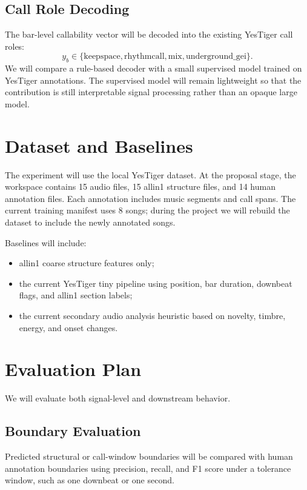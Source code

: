 \documentclass[lettersize,journal]{IEEEtran}
\begin{document}
\subsection{Call Role Decoding}
The bar-level callability vector will be decoded into the existing YesTiger call roles:
\begin{equation}
y_b \in
\{\mathrm{keepspace}, \mathrm{rhythmcall}, \mathrm{mix}, \mathrm{underground\_gei}\}.
\end{equation}
We will compare a rule-based decoder with a small supervised model trained on YesTiger annotations. The supervised model will remain lightweight so that the contribution is still interpretable signal processing rather than an opaque large model.

\section{Dataset and Baselines}
The experiment will use the local YesTiger dataset. At the proposal stage, the workspace contains 15 audio files, 15 allin1 structure files, and 14 human annotation files. Each annotation includes music segments and call spans. The current training manifest uses 8 songs; during the project we will rebuild the dataset to include the newly annotated songs.

Baselines will include:
\begin{itemize}
\item allin1 coarse structure features only;
\item the current YesTiger tiny pipeline using position, bar duration, downbeat flags, and allin1 section labels;
\item the current secondary audio analysis heuristic based on novelty, timbre, energy, and onset changes.
\end{itemize}

\section{Evaluation Plan}
We will evaluate both signal-level and downstream behavior.

\subsection{Boundary Evaluation}
Predicted structural or call-window boundaries will be compared with human annotation boundaries using precision, recall, and F1 score under a tolerance window, such as one downbeat or one second.
\end{document}
